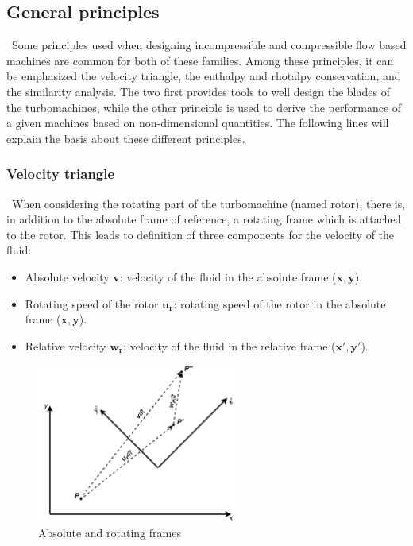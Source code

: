 \subsection{General principles}
\quad\ Some principles used when designing incompressible and compressible flow based machines are common for both of these families. Among these principles, it can be emphasized the velocity triangle, the enthalpy and rhotalpy conservation, and the similarity analysis. The two first provides tools to well design the blades of the turbomachines, while the other principle is used to derive the performance of a given machines based on non-dimensional quantities. The following lines will explain the basis about these different principles. 

\subsubsection{Velocity triangle}
\quad\ When considering the rotating part of the turbomachine (named rotor), there is, in addition to the absolute frame of reference, a rotating frame which is attached to the rotor. This leads to definition of three components for the velocity of the fluid: 

\begin{itemize}
    \item Absolute velocity \(\mathbf{v}\): velocity of the fluid in the absolute frame (\(\mathbf{x},\mathbf{y}\)).
    \item Rotating speed of the rotor \(\mathbf{u_r}\): rotating speed of the rotor in the absolute frame (\(\mathbf{x},\mathbf{y}\)).
    \item Relative velocity \(\mathbf{w_r}\): velocity of the fluid in the relative frame  (\(\mathbf{x'},\mathbf{y'}\)).
\end{itemize}

\begin{figure}[h]
    \centering
    \includegraphics[width=0.6\textwidth]{Frames.png}
    \caption{Absolute and rotating frames}
    \label{fig:C3_frames}
\end{figure}


